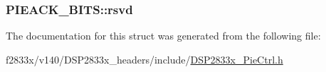 \subsubsection[{rsvd}]{ P\+I\+E\+A\+C\+K\+\_\+\+B\+I\+T\+S\+::rsvd}\label{struct_p_i_e_a_c_k___b_i_t_s_a496cb17a2112ffcf4a6c2d03c57e4110}


The documentation for this struct was generated from the following file\+:\begin{DoxyCompactItemize}
\item 
f2833x/v140/\+D\+S\+P2833x\+\_\+headers/include/\hyperlink{_d_s_p2833x___pie_ctrl_8h}{D\+S\+P2833x\+\_\+\+Pie\+Ctrl.\+h}\end{DoxyCompactItemize}
